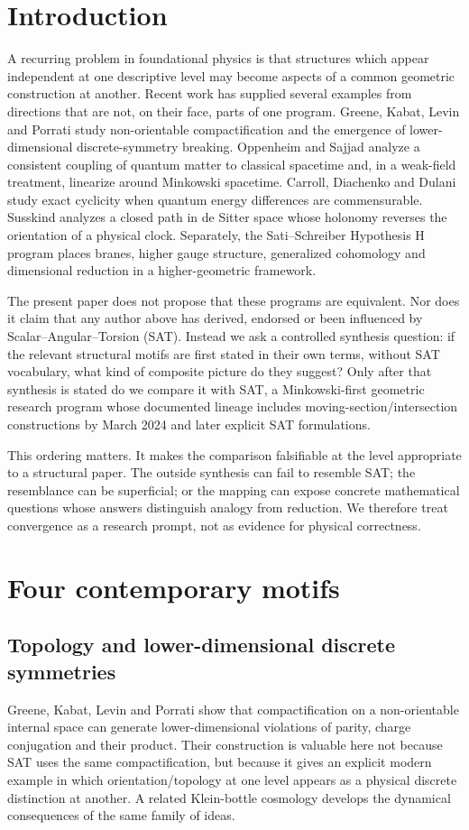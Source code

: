 \documentclass[11pt]{article}
\begin{document}
\section{Introduction}
A recurring problem in foundational physics is that structures which appear independent at one descriptive level may become aspects of a common geometric construction at another. Recent work has supplied several examples from directions that are not, on their face, parts of one program. Greene, Kabat, Levin and Porrati study non-orientable compactification and the emergence of lower-dimensional discrete-symmetry breaking. Oppenheim and Sajjad analyze a consistent coupling of quantum matter to classical spacetime and, in a weak-field treatment, linearize around Minkowski spacetime. Carroll, Diachenko and Dulani study exact cyclicity when quantum energy differences are commensurable. Susskind analyzes a closed path in de Sitter space whose holonomy reverses the orientation of a physical clock. Separately, the Sati--Schreiber Hypothesis H program places branes, higher gauge structure, generalized cohomology and dimensional reduction in a higher-geometric framework.

The present paper does not propose that these programs are equivalent. Nor does it claim that any author above has derived, endorsed or been influenced by Scalar--Angular--Torsion (SAT). Instead we ask a controlled synthesis question: if the relevant structural motifs are first stated in their own terms, without SAT vocabulary, what kind of composite picture do they suggest? Only after that synthesis is stated do we compare it with SAT, a Minkowski-first geometric research program whose documented lineage includes moving-section/intersection constructions by March 2024 and later explicit SAT formulations.

This ordering matters. It makes the comparison falsifiable at the level appropriate to a structural paper. The outside synthesis can fail to resemble SAT; the resemblance can be superficial; or the mapping can expose concrete mathematical questions whose answers distinguish analogy from reduction. We therefore treat convergence as a research prompt, not as evidence for physical correctness.

\section{Four contemporary motifs}
\subsection{Topology and lower-dimensional discrete symmetries}
Greene, Kabat, Levin and Porrati show that compactification on a non-orientable internal space can generate lower-dimensional violations of parity, charge conjugation and their product. Their construction is valuable here not because SAT uses the same compactification, but because it gives an explicit modern example in which orientation/topology at one level appears as a physical discrete distinction at another. A related Klein-bottle cosmology develops the dynamical consequences of the same family of ideas.
\end{document}
